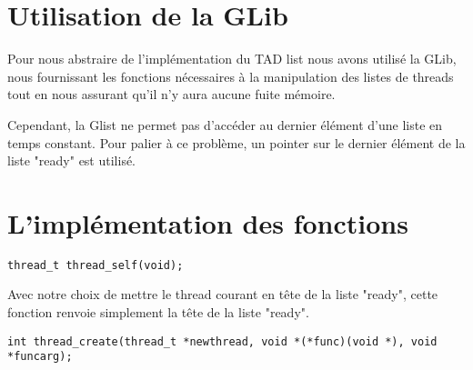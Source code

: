 \section {Utilisation de la GLib}

Pour nous abstraire de l'implémentation du TAD list nous avons utilisé
la GLib, nous fournissant les fonctions nécessaires à la manipulation
des listes de threads tout en nous assurant qu'il n'y aura aucune
fuite mémoire.

Cependant, la Glist ne permet pas d'accéder au dernier élément d'une
liste en temps constant. Pour palier à ce problème, un pointer sur le
dernier élément de la liste "ready" est utilisé.

\section {L'implémentation des fonctions}

\begin{verbatim}
thread_t thread_self(void);
\end{verbatim}
Avec notre choix de mettre le thread courant en tête de la liste "ready",
cette fonction renvoie simplement la tête de la liste "ready".
~~\\
\begin{verbatim}
int thread_create(thread_t *newthread, void *(*func)(void *), void *funcarg);
\end{verbatim}


